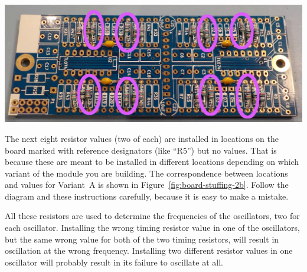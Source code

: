 \noindent\includegraphics[width=\linewidth]{res-27k.jpg}

The next eight resistor values (two of each) are installed in locations on
the board marked with reference designators (like ``R5'') but no values. 
That is because these are meant to be installed in different locations
depending on which variant of the module you are building.  The
correspondence between locations and values for Variant~A is shown in
Figure~\ref{fig:board-stuffing-2b}.  Follow the diagram and these
instructions carefully, because it is easy to make a mistake.

All these resistors are used to determine the frequencies of the
oscillators, two for each oscillator.  Installing the wrong timing resistor
value in one of the oscillators, but the same wrong value for both of the
two timing resistors, will result in oscillation at the wrong frequency. 
Installing two different resistor values in one oscillator will probably
result in its failure to oscillate at all.

\def\RVA{150k$\Omega$}\def\CVA{0.10$\mu$F}\def\TVA{94ms}\def\FVA{11Hz}
\def\RVB{100k$\Omega$}\def\CVB{0.47$\mu$F}\def\TVB{300ms}\def\FVB{3.4Hz}
\def\RVC{390k$\Omega$}\def\CVC{0.22$\mu$F}\def\TVC{540ms}\def\FVC{1.8Hz}
\def\RVD{1.2M$\Omega$}\def\CVD{0.22$\mu$F}\def\TVD{1.6s}\def\FVD{600mHz}
\def\RVE{5.6M$\Omega$}\def\CVE{0.10$\mu$F}\def\TVE{3.5s}\def\FVE{280mHz}
\def\RVF{1.0M$\Omega$}\def\CVF{1.0$\mu$F}\def\TVF{6.3s}\def\FVF{160mHz}
\def\RVG{1.8M$\Omega$}\def\CVG{1.0$\mu$F}\def\TVG{11s}\def\FVG{88mHz}
\def\RVH{10M$\Omega$}\def\CVH{0.47$\mu$F}\def\TVH{30s}\def\FVH{34mHz}

